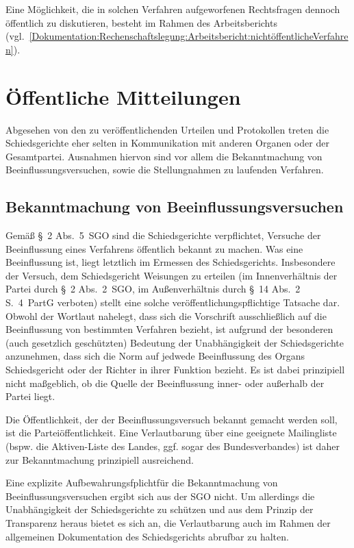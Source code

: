 Eine Möglichkeit, die in solchen Verfahren aufgeworfenen Rechtsfragen dennoch öffentlich zu diskutieren, besteht im Rahmen des Arbeitsberichts (vgl.~\ref{Dokumentation:Rechenschaftslegung:Arbeitsbericht:nichtöffentlicheVerfahren}).

\section{Öffentliche Mitteilungen}
\label{Dokumentation:Veröffentlichungen}
Abgesehen von den zu veröffentlichenden Urteilen und Protokollen treten die Schiedsgerichte eher selten in Kommunikation mit anderen Organen oder der Gesamtpartei.
Ausnahmen hiervon sind vor allem die Bekanntmachung von Beeinflussungsversuchen, sowie die Stellungnahmen zu laufenden Verfahren.

\subsection{Bekanntmachung von Beeinflussungsversuchen}
\label{Dokumentation:Veröffentlichungen:Beeinflussungen}
Gemäß \S~2 Abs.~5~SGO sind die Schiedsgerichte verpflichtet, Versuche der Beeinflussung eines Verfahrens öffentlich bekannt zu machen.
Was eine Beeinflussung ist, liegt letztlich im Ermessen des Schiedsgerichts.
Insbesondere der Versuch, dem Schiedsgericht Weisungen zu erteilen (im Innenverhältnis der Partei durch \S~2 Abs.~2~SGO, im Außenverhältnis durch \S~14 Abs.~2 S.~4~PartG verboten) stellt eine solche veröffentlichungspflichtige Tatsache dar.
Obwohl der Wortlaut nahelegt, dass sich die Vorschrift ausschließlich auf die Beeinflussung von bestimmten Verfahren bezieht, ist aufgrund der besonderen (auch gesetzlich geschützten) Bedeutung der Unabhängigkeit der Schiedsgerichte anzunehmen, dass sich die Norm auf jedwede Beeinflussung des Organs Schiedsgericht oder der Richter in ihrer Funktion bezieht.
Es ist dabei prinzipiell nicht maßgeblich, ob die Quelle der Beeinflussung inner- oder außerhalb der Partei liegt.

Die Öffentlichkeit, der der Beeinflussungsversuch bekannt gemacht werden soll, ist die Parteiöffentlichkeit.
Eine Verlautbarung über eine geeignete Mailingliste (bspw. die Aktiven-Liste des Landes, ggf. sogar des Bundesverbandes) ist daher zur Bekanntmachung prinzipiell ausreichend.

Eine explizite Aufbewahrungsfplichtfür die Bekanntmachung von Beeinflussungsversuchen ergibt sich aus der SGO nicht.
Um allerdings die Unabhängigkeit der Schiedsgerichte zu schützen und aus dem Prinzip der Transparenz heraus bietet es sich an, die Verlautbarung auch im Rahmen der allgemeinen Dokumentation des Schiedsgerichts abrufbar zu halten.

